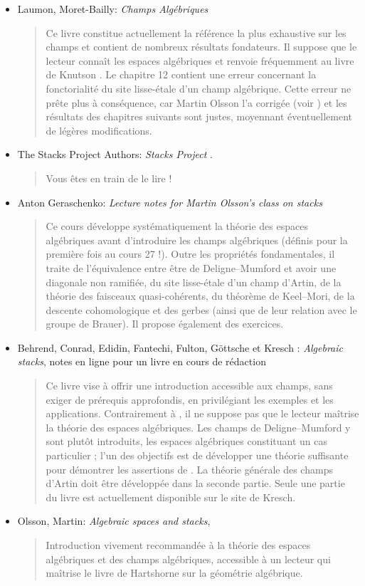 \begin{itemize}
\item Laumon, Moret-Bailly: \emph{Champs Alg\'ebriques} \cite{LM-B}
\begin{quote}
Ce livre constitue actuellement la référence la plus exhaustive sur les champs
et contient de nombreux résultats fondateurs. Il suppose que le lecteur connaît
les espaces algébriques et renvoie fréquemment au livre de Knutson \cite{Kn}. Le
chapitre 12 contient une erreur concernant la fonctorialité du site lisse-étale
d'un champ algébrique. Cette erreur ne prête plus à conséquence, car Martin
Olsson l'a corrigée (voir \cite{olsson_sheaves}) et les résultats des chapitres
suivants sont justes, moyennant éventuellement de légères modifications.
\end{quote}
\item The Stacks Project Authors: \emph{Stacks Project}
\cite{stacks-project}.
\begin{quote}
Vous êtes en train de le lire !
\end{quote}
\item Anton Geraschenko:
\emph{Lecture notes for Martin Olsson's class on stacks} \cite{olsson_stacks}
\begin{quote}
Ce cours développe systématiquement la théorie des espaces
algébriques avant d'introduire les champs algébriques (définis pour la première
fois au cours 27 !). Outre les propriétés fondamentales, il traite de
l'équivalence entre être de Deligne--Mumford et avoir une diagonale non ramifiée,
du site lisse-étale d'un champ d'Artin, de la théorie des faisceaux quasi-cohérents,
du théorème de Keel--Mori, de la descente cohomologique et des gerbes (ainsi que
de leur relation avec le groupe de Brauer). Il propose également des exercices.
\end{quote}
\item
Behrend, Conrad, Edidin, Fantechi, Fulton, G\"ottsche et Kresch :
\emph{Algebraic stacks}, notes en ligne pour un livre en cours de rédaction
\cite{stacks_book}
\begin{quote}
Ce livre vise à offrir une introduction accessible aux champs, sans exiger de
prérequis approfondis, en privilégiant les exemples et les applications.
Contrairement à \cite{LM-B}, il ne suppose pas que le lecteur maîtrise la théorie
des espaces algébriques. Les champs de Deligne--Mumford y sont plutôt introduits,
les espaces algébriques constituant un cas particulier ; l'un des objectifs est de
développer une théorie suffisante pour démontrer les assertions de \cite{DM}. La
théorie générale des champs d'Artin doit être développée dans la seconde partie.
Seule une partie du livre est actuellement disponible sur le site de Kresch.
\end{quote}
\item Olsson, Martin: \emph{Algebraic spaces and stacks}, \cite{olsson_book}
\begin{quote}
Introduction vivement recommandée à la théorie des espaces algébriques et des
champs algébriques, accessible à un lecteur qui maîtrise le livre
de Hartshorne sur la géométrie algébrique.
\end{quote}
\end{itemize}


